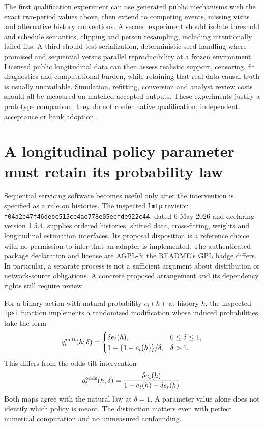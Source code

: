 The first qualification experiment can use generated public mechanisms with the exact two-period values above, then extend to competing events, missing visits and alternative history conventions. A second experiment should isolate threshold and schedule semantics, clipping and person resampling, including intentionally failed fits. A third should test serialization, deterministic seed handling where promised and sequential versus parallel reproducibility at a frozen environment. Licensed public longitudinal data can then assess realistic support, censoring, fit diagnostics and computational burden, while retaining that real-data causal truth is usually unavailable. Simulation, refitting, conversion and analyst review costs should all be measured on matched accepted outputs. These experiments justify a prototype comparison; they do not confer native qualification, independent acceptance or bank adoption.


\section{A longitudinal policy parameter must retain its probability law}
\label{exec23:lmtp-scope}

Sequential servicing software becomes useful only after the intervention is
specified as a rule on histories. The inspected \texttt{lmtp} revision
\texttt{f04a2b47f46debc515ce4ae778e05ebfde922c44}, dated 6 May 2026 and
declaring version 1.5.4, supplies ordered histories, shifted data, cross-fitting,
weights and longitudinal estimation interfaces. Its proposal disposition is a
reference choice with no permission to infer that an adapter is implemented.
The authenticated package declaration and license are AGPL-3; the README's
GPL badge differs. In particular, a separate process is not a sufficient
argument about distribution or network-source obligations. A concrete proposed
arrangement and its dependency rights still require review.
\citep{exec22_lmtp_reuse}

For a binary action with natural probability $e_t(h)$ at history $h$, the
inspected \texttt{ipsi} function implements a randomized modification whose
induced probabilities take the form
\begin{equation}
 q^{\rm shift}_t(h;\delta)=
 \begin{cases}
 \delta e_t(h),&0\leq\delta\leq1,\\
 1-\{1-e_t(h)\}/\delta,&\delta>1.
 \end{cases}
 \label{exec23:lmtp-shift}
\end{equation}
This differs from the odds-tilt intervention
\begin{equation}
 q^{\rm odds}_t(h;\delta)=
 \frac{\delta e_t(h)}{1-e_t(h)+\delta e_t(h)}.
 \label{exec23:lmtp-odds}
\end{equation}
Both maps agree with the natural law at $\delta=1$. A parameter value alone
does not identify which policy is meant. The distinction matters even with
perfect numerical computation and no unmeasured confounding.
\citep{exec22_lmtp_reuse,exec23_policy_reference}

